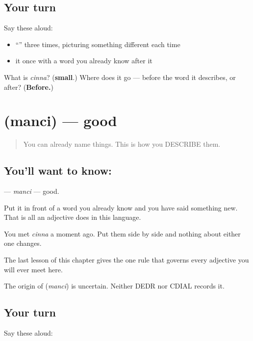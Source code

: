 \subsection*{Your turn}
Say these aloud:

\begin{itemize}
\raggedright
  \item \textquotedblleft{}\textquotedblright{} three times, picturing something different each time
  \item it once with a word you already know after it
\end{itemize}

\begin{tcolorbox}[breakable,colback=teal!4,colframe=teal!35!black,title={Before you move on}]
What is \emph{cinna}? (\textbf{small}.) Where does it go — before the word it describes, or after? (\textbf{Before.})
\end{tcolorbox}
\section[\texorpdfstring{\te{మంచి} (manci)}{మంచి (manci)}]{ (manci) — good}

\label{lesson:TE-C42-good}



\begin{quote}
You can already name things. This is how you DESCRIBE them.
\end{quote}

\subsection*{You'll want to know: }
\textbf{} — \emph{manci} — good.

Put it in front of a word you already know and you have said something new. That is all an adjective does in this language.

You met \textbf{} \emph{cinna} a moment ago. Put them side by side and nothing about either one changes.

The last lesson of this chapter gives the one rule that governs every adjective you will ever meet here.

\begin{cousinweb}
The origin of \textbf{} (\emph{manci}) is uncertain. Neither DEDR nor CDIAL records it.
\end{cousinweb}

\subsection*{Your turn}
Say these aloud:

